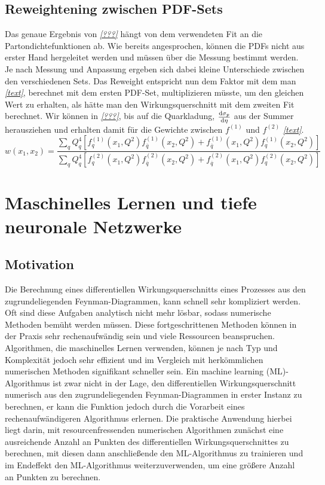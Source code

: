 \section{Reweightening zwischen PDF-Sets}
Das genaue Ergebnis von \textit{\autoref{???}} hängt von dem verwendeten Fit an die Partondichtefunktionen ab. Wie bereits angesprochen, können die PDFs nicht aus erster Hand hergeleitet werden und müssen über die Messung bestimmt werden. Je nach Messung und Anpassung ergeben sich dabei kleine Unterschiede zwischen den verschiedenen Sets. Das Reweight entspricht nun dem Faktor mit dem man \textit{\autoref{text}}, berechnet mit dem ersten PDF-Set, multiplizieren müsste, um den gleichen Wert zu erhalten, als hätte man den Wirkungsquerschnitt mit dem zweiten Fit berechnet. Wir können in \textit{\autoref{???}}, bis auf die Quarkladung,  $\derivative{\sigma_p}{\eta}$ aus der Summer herausziehen und erhalten damit für die Gewichte zwischen $f^{(1)}$ und $f^{(2)}$ \textit{\autoref{text}}.
\begin{equation}
	w\left(x_1, x_2\right) = \frac{ \sum_{q} Q_q^4 \left[f_q^{(1)}(x_1, Q^2)f_{\overline{q}}^{(1)}(x_2, Q^2) +f_{\overline{q}}^{(1)}(x_1, Q^2)f_{q}^{(1)}(x_2, Q^2) \right]}{\sum_{q} Q_q^4 \left[f_q^{(2)}(x_1, Q^2)f_{\overline{q}}^{(2)}(x_2, Q^2) +f_{\overline{q}}^{(2)}(x_1, Q^2)f_{q}^{(2)}(x_2, Q^2) \right]}
\end{equation}

\chapter{Maschinelles Lernen und tiefe neuronale Netzwerke}
\section{Motivation}
Die Berechnung eines differentiellen Wirkungsquerschnitts eines Prozesses aus den zugrundeliegenden Feynman-Diagrammen, kann schnell sehr kompliziert werden. Oft sind diese Aufgaben analytisch nicht mehr lösbar, sodass numerische Methoden bemüht werden müssen. Diese fortgeschrittenen Methoden können in der Praxis sehr rechenaufwändig sein und viele Ressourcen beanspruchen. Algorithmen, die maschinelles Lernen verwenden, können je nach Typ und Komplexität jedoch sehr effizient und im Vergleich mit herkömmlichen numerischen Methoden signifikant schneller sein. Ein machine learning (ML)-Algorithmus ist zwar nicht in der Lage, den differentiellen Wirkungsquerschnitt numerisch aus den zugrundeliegenden Feynman-Diagrammen in erster Instanz zu berechnen, er kann die Funktion jedoch durch die Vorarbeit eines rechenaufwändigeren Algorithmus erlernen. Die praktische Anwendung hierbei liegt darin, mit resourcenfressenden numerischen Algorithmen zunächst eine ausreichende Anzahl an Punkten des differentiellen Wirkungsquerschnittes zu berechnen, mit diesen dann anschließende den ML-Algorithmus zu trainieren und im Endeffekt den ML-Algorithmus weiterzuverwenden, um eine größere Anzahl an Punkten zu berechnen.


